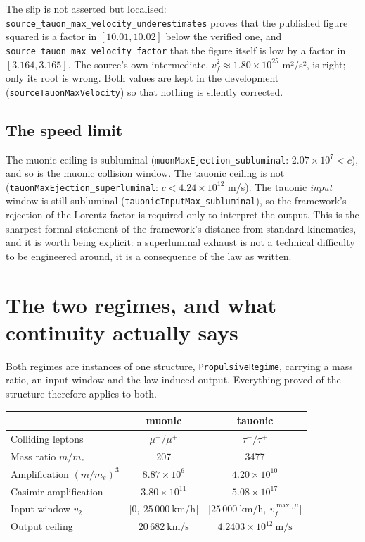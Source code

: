 \documentclass[11pt,a4paper]{article}
\begin{document}
The slip is not asserted but localised: \texttt{source\_tauon\_max\_velocity\_underestimates}
proves that the published figure squared is a factor in $[10.01, 10.02]$ below
the verified one, and \texttt{source\_tauon\_max\_velocity\_factor} that the
figure itself is low by a factor in $[3.164, 3.165]$.  The source's own
intermediate, $v_f^2 \approx 1.80\times10^{25}$ m²/s², is right; only its root is
wrong.  Both values are kept in the development
(\texttt{sourceTauonMaxVelocity}) so that nothing is silently corrected.

\subsection*{The speed limit}

The muonic ceiling is subluminal (\texttt{muonMaxEjection\_subluminal}:
$2.07\times10^{7} < c$), and so is the muonic collision window.  The tauonic
ceiling is not (\texttt{tauonMaxEjection\_superluminal}:
$c < 4.24\times10^{12}$ m/s).  The tauonic \emph{input} window is still
subluminal (\texttt{tauonicInputMax\_subluminal}), so the framework's rejection
of the Lorentz factor is required only to interpret the output.  This is the
sharpest formal statement of the framework's distance from standard kinematics,
and it is worth being explicit: a superluminal exhaust is not a technical
difficulty to be engineered around, it is a consequence of the law as written.


\section{The two regimes, and what continuity actually says}
\label{sec:regimes}

Both regimes are instances of one structure, \texttt{PropulsiveRegime}, carrying
a mass ratio, an input window and the law-induced output.  Everything proved of
the structure therefore applies to both.

\begin{center}\small
\begin{tabular}{@{}lcc@{}}
\toprule
 & muonic & tauonic \\
\midrule
Colliding leptons & $\mu^-/\mu^+$ & $\tau^-/\tau^+$ \\
Mass ratio $m/m_e$ & 207 & 3477 \\
Amplification $(m/m_e)^3$ & $8.87\times10^{6}$ & $4.20\times10^{10}$ \\
Casimir amplification & $3.80\times10^{11}$ & $5.08\times10^{17}$ \\
Input window $v_2$ & $]0,\ 25\,000\ \mathrm{km/h}]$ & $]25\,000\ \mathrm{km/h},\ v_f^{\max,\mu}]$ \\
Output ceiling & $20\,682\ \mathrm{km/s}$ & $4.2403\times10^{12}\ \mathrm{m/s}$ \\
\bottomrule
\end{tabular}
\end{center}
\end{document}
